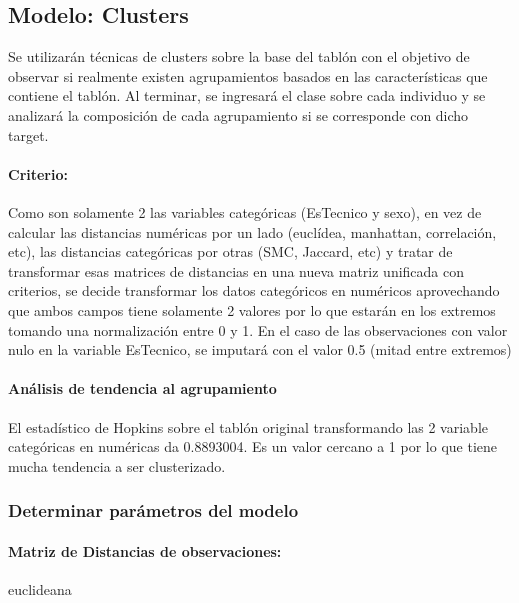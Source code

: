 \subsection{Modelo: Clusters}

Se utilizarán técnicas de clusters sobre la base del tablón con el objetivo de observar si realmente existen agrupamientos basados en las características que contiene el tablón. Al terminar, se ingresará el clase sobre cada individuo y se analizará la composición de cada agrupamiento si se corresponde con dicho target. \\

\paragraph{\textbf{Criterio:}}

Como son solamente 2 las variables categóricas (EsTecnico y
sexo), en vez de calcular las distancias numéricas por un lado
(euclídea, manhattan, correlación, etc), las distancias categóricas por
otras (SMC, Jaccard, etc) y tratar de transformar esas matrices de
distancias en una nueva matriz unificada con criterios, se decide
transformar los datos categóricos en numéricos aprovechando que ambos
campos tiene solamente 2 valores por lo que estarán en los extremos
tomando una normalización entre 0 y 1. En el caso de las observaciones con valor nulo en la variable EsTecnico, se imputará con el valor
0.5 (mitad entre extremos)

\paragraph{Análisis de tendencia al agrupamiento}

El estadístico de Hopkins sobre el tablón original transformando las 2
variable categóricas en numéricas da 0.8893004. Es un valor cercano a 1
por lo que tiene mucha tendencia a ser clusterizado.

\subsubsection{\textbf{Determinar parámetros del modelo}}

\paragraph{\textbf{Matriz de Distancias de observaciones:}} euclideana

